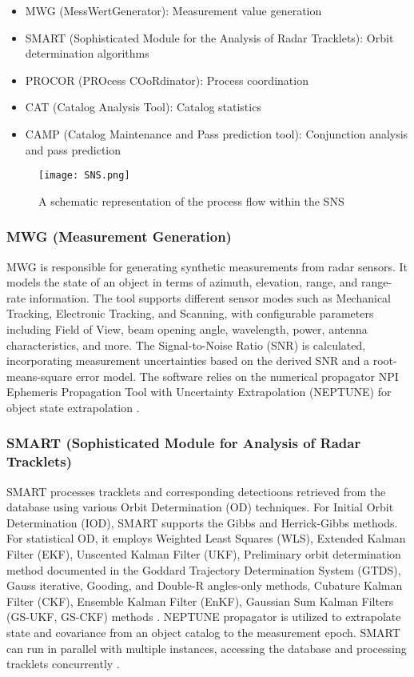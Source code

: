 \begin{itemize}
    \item MWG (MessWertGenerator): Measurement value generation
    \item SMART (Sophisticated Module for the Analysis of Radar Tracklets): Orbit determination algorithms
    \item PROCOR (PROcess COoRdinator): Process coordination
    \item CAT (Catalog Analysis Tool): Catalog statistics
    \item CAMP (Catalog Maintenance and Pass prediction tool): Conjunction analysis and pass prediction
\end{itemize}

\begin{figure}[h!]
	\centering
	\texttt{[image: SNS.png]}
	\caption{A schematic representation of the process flow within the SNS \cite{kebschull2017simulation}}\label{fig:SNS}
\end{figure}

\subsubsection{MWG (Measurement Generation)}
MWG is responsible for generating synthetic measurements from radar sensors. It models the state of an object in terms of azimuth, elevation, range, and range-rate information. 
The tool supports different sensor modes such as Mechanical Tracking, Electronic Tracking, and Scanning, with configurable parameters including Field of View, beam opening angle, wavelength, power, antenna characteristics, 
and more. The Signal-to-Noise Ratio (SNR) is calculated, incorporating measurement uncertainties based on the derived SNR and a root-means-square error model. The software relies on the numerical propagator NPI 
Ephemeris Propagation Tool with Uncertainty Extrapolation (NEPTUNE) for object state extrapolation \cite{kebschull2017simulation}.

\subsubsection{SMART (Sophisticated Module for Analysis of Radar Tracklets)}
SMART processes tracklets and corresponding detectioons retrieved from the database using various Orbit Determination (OD) techniques. 
For Initial Orbit Determination (IOD), SMART supports the Gibbs and Herrick-Gibbs methods. For statistical OD, it employs Weighted Least Squares (WLS), Extended Kalman Filter (EKF), Unscented Kalman Filter (UKF), Preliminary orbit determination method documented in the Goddard Trajectory Determination System (GTDS),
Gauss iterative, Gooding, and Double-R angles-only methods, Cubature Kalman Filter (CKF), Ensemble Kalman Filter (EnKF), Gaussian Sum Kalman Filters (GS-UKF, GS-CKF) methods \cite{ams}. NEPTUNE propagator is utilized to extrapolate state and covariance from an object catalog to the measurement epoch. SMART can run in parallel with multiple instances, accessing the database and processing tracklets concurrently \cite{kebschull2017simulation}.


